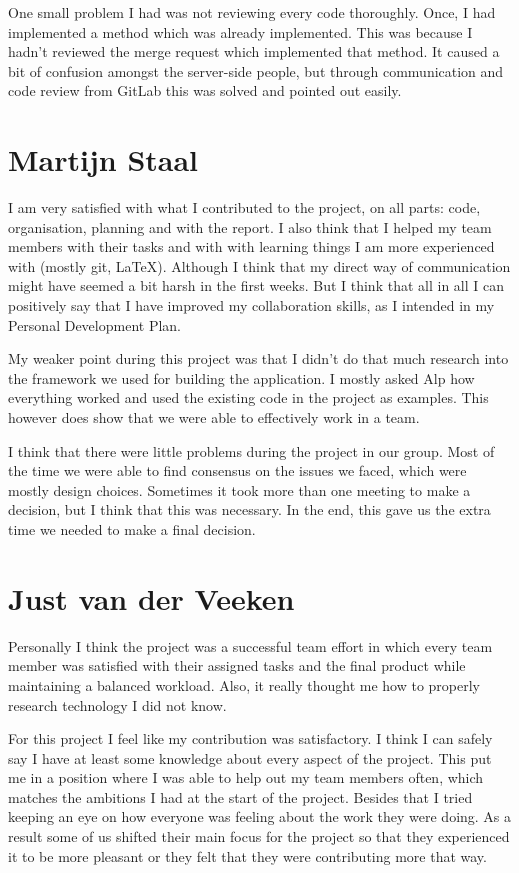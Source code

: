One small problem I had was not reviewing every code thoroughly.
Once, I had implemented a method which was already implemented.
This was because I hadn't reviewed the merge request which implemented that method.
It caused a bit of confusion amongst the server-side people, but through communication and code review from GitLab this was solved and pointed out easily.

\section{Martijn Staal}
I am very satisfied with what I contributed to the project, on all parts: code, organisation,
planning and with the report. I also think that I helped my team members with their tasks
and with with learning things I am more experienced with (mostly git, LaTeX). Although I
think that my direct way of communication might have seemed a bit harsh in the first weeks.
But I think that all in all I can positively say that I have improved my collaboration
skills, as I intended in my Personal Development Plan.

My weaker point during this project was that I didn't do that much research into the
framework we used for building the application. I mostly asked Alp how everything worked
and used the existing code in the project as examples. This however does show that we
were able to effectively work in a team.

I think that there were little problems during the project in our group. Most of the time
we were able to find consensus on the issues we faced, which were mostly design choices.
Sometimes it took more than one meeting to make a decision, but I think that this was
necessary. In the end, this gave us the extra time we needed to make a final decision.

\section{Just van der Veeken}
Personally I think the project was a successful team effort in which every team member was satisfied with their assigned tasks and the final product while maintaining a balanced workload. Also, it really thought me how to properly research technology I did not know.

For this project I feel like my contribution was satisfactory. I think I can safely say I have at least some knowledge about every aspect of the project.
This put me in a position where I was able to help out my team members often, which matches the ambitions I had at the start of the project.
Besides that I tried keeping an eye on how everyone was feeling about the work they were doing. As a result some of us shifted their main focus for the project so that they experienced it to be more pleasant or they felt that they were contributing more that way.

